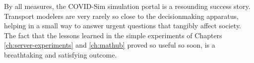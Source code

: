 By all measures, the COVID-Sim simulation portal is a resounding success story. Transport modelers are very rarely so close to the decisionmaking apparatus, helping in a small way to answer urgent questions that tangibly affect society. The fact that the lessons learned in the simple experiments of Chapters \ref{ch:server-experiments} and \ref{ch:mathub} proved so useful so soon, is a breathtaking and satisfying outcome.
